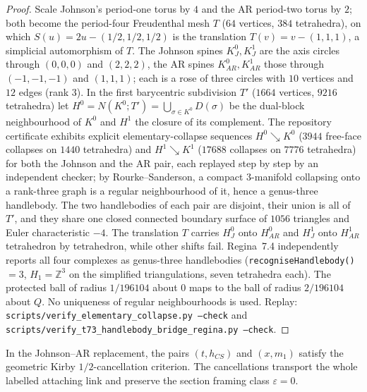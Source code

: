 \begin{proof}
Scale Johnson's period-one torus by $4$ and the AR period-two torus by $2$;
both become the period-four Freudenthal mesh $T$ ($64$ vertices, $384$
tetrahedra), on which $S(u)=2u-(1/2,1/2,1/2)$ is the translation
$T(v)=v-(1,1,1)$, a simplicial automorphism of $T$.  The Johnson spines
$K_J^0,K_J^1$ are the axis circles through $(0,0,0)$ and $(2,2,2)$, the AR
spines $K_{AR}^0,K_{AR}^1$ those through $(-1,-1,-1)$ and $(1,1,1)$; each is
a rose of three circles with $10$ vertices and $12$ edges (rank $3$).  In the
first barycentric subdivision $T'$ ($1664$ vertices, $9216$ tetrahedra) let
$H^0=N(K^0;T')=\bigcup_{\sigma\in K^0}D(\sigma)$ be the dual-block
neighbourhood of $K^0$ and $H^1$ the closure of its complement.  The
repository certificate exhibits explicit elementary-collapse sequences
$H^0\searrow K^0$ ($3944$ free-face collapses on $1440$ tetrahedra) and
$H^1\searrow K^1$ ($17688$ collapses on $7776$ tetrahedra) for both the
Johnson and the AR pair, each replayed step by step by an independent
checker; by Rourke--Sanderson, a compact $3$-manifold collapsing onto a
rank-three graph is a regular neighbourhood of it, hence a genus-three
handlebody.  The two handlebodies of each pair are disjoint, their union is
all of $T'$, and they share one closed connected boundary surface of $1056$
triangles and Euler characteristic $-4$.  The translation $T$ carries
$H_J^0$ onto $H_{AR}^0$ and $H_J^1$ onto $H_{AR}^1$ tetrahedron by
tetrahedron, while other shifts fail.  Regina~7.4 independently reports
all four complexes as genus-three handlebodies
(\texttt{recogniseHandlebody()}$=3$, $H_1=\mathbb Z^3$ on the simplified
triangulations, seven tetrahedra each).  The protected
ball of radius $1/196104$ about $0$ maps to the ball of radius $2/196104$
about $Q$.  No uniqueness of regular neighbourhoods is used.  Replay:
\texttt{scripts/verify\_elementary\_collapse.py --check} and
\texttt{scripts/verify\_t73\_handlebody\_bridge\_regina.py --check}.
\end{proof}

\begin{lemma}\label{lem:P0b}
In the Johnson--AR replacement, the pairs \((t,h_{CS})\) and \((x,m_1)\)
satisfy the geometric Kirby \(1/2\)-cancellation criterion.  The
cancellations transport the whole labelled attaching link and preserve the
section framing class \(\varepsilon=0\).
\end{lemma}

